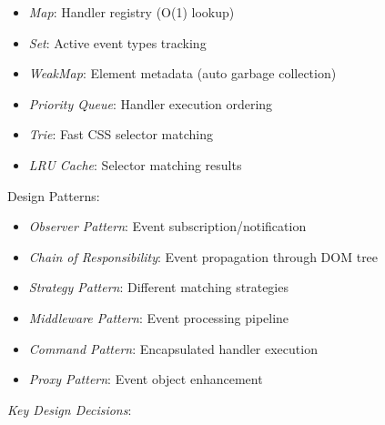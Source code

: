 \documentclass[11pt]{article}
\begin{document}
\begin{itemize}
\item \emph{Map}: Handler registry (O(1) lookup)
\item \emph{Set}: Active event types tracking
\item \emph{WeakMap}: Element metadata (auto garbage collection)
\item \emph{Priority Queue}: Handler execution ordering
\item \emph{Trie}: Fast CSS selector matching
\item \emph{LRU Cache}: Selector matching results
\end{itemize}

Design Patterns:

\begin{itemize}
\item \emph{Observer Pattern}: Event subscription/notification
\item \emph{Chain of Responsibility}: Event propagation through DOM tree
\item \emph{Strategy Pattern}: Different matching strategies
\item \emph{Middleware Pattern}: Event processing pipeline
\item \emph{Command Pattern}: Encapsulated handler execution
\item \emph{Proxy Pattern}: Event object enhancement
\end{itemize}

\emph{Key Design Decisions}:
\end{document}
